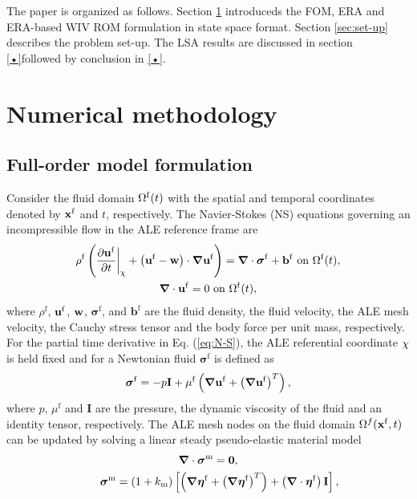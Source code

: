 The paper is organized as follows. Section  \ref{sec:Numeric method} introduceds the FOM, ERA and ERA-based WIV ROM 
formulation in state space format. Section \ref{sec:set-up} describes the problem set-up. The LSA results are discussed 
in section \ref{•}followed by conclusion in \ref{•}. 

\section{Numerical methodology}\label{sec:Numeric method}
\subsection{Full-order model formulation}

Consider the fluid domain $\Omega^\mathrm{f}(t)$ with the spatial and temporal coordinates 
denoted by $\mbox{$\mathbf{x}^{\mathrm{f}}$}$ and $t$, respectively.
%
The Navier-Stokes (NS) equations governing an incompressible flow  
in the ALE reference frame are
\begin{gather}
\rho^\mathrm{f} \left( \frac{\partial \mathbf{u}^\mathrm{f}}{\partial t} \bigg\rvert_{\mathbf{\chi}} + \left(\mathbf{u}^\mathrm{f}-\mathbf{w}\right)\cdot \boldsymbol{\nabla} \mathbf{u}^
\mathrm{f} \right ) = \boldsymbol{\nabla} \cdot \boldsymbol{\sigma}^\mathrm{f} + \mathbf{b}^\mathrm{f} \mbox{ on } \Omega^\mathrm{f}(t) \label{eq:N-S}, \\
\boldsymbol{\nabla} \cdot\mathbf{u}^\mathrm{f} = 0 \mbox{ on } \Omega^\mathrm{f}(t) \label{eq:continuity},
\end{gather}
where $\rho^\mathrm{f}$, $\mathbf{u}^\mathrm{f}$, 
$\mathbf{w}$, $\boldsymbol{\sigma}^\mathrm{f}$, and $\mathbf{b}^\mathrm{f}$ 
are the fluid density, the fluid velocity, the ALE mesh velocity, the 
Cauchy stress tensor and the body force per unit mass, respectively. 
%
For the partial time derivative in Eq. (\ref{eq:N-S}), 
the ALE referential coordinate $\mathbf{\chi}$ is held fixed and for a Newtonian fluid
$\boldsymbol{\sigma}^\mathrm{f}$ is defined as
\begin{equation}
\boldsymbol{\sigma}^\mathrm{f} = -p\mathbf{I} + \mu^\mathrm{f}\left(\boldsymbol{\nabla} \mathbf{u}^\mathrm{f} + \left(\boldsymbol{\nabla} \mathbf{u}^\mathrm{f}\right)^T
\right),
\label{eq:cauchyStress}
\end{equation}
%
where $p$, $\mu^\mathrm{f}$ and $ \mathbf{I} $ are the  pressure, the dynamic viscosity of the fluid and an identity tensor, respectively.
The ALE mesh nodes on the fluid domain $\Omega^f(\mbox{$\mathbf{x}^{\mathrm{f}}$},t)$ can be updated by solving a linear steady pseudo-elastic material model
\begin{gather}
\mbox{\boldmath $\nabla$} \cdot {\mbox{\boldmath $\sigma$}}^\mathrm{m} = \mbox{\boldmath $0$}, \\
\qquad {\mbox{\boldmath $\sigma$}}^\mathrm{m} = (1+k_\mathrm{m})\left[\left(\mbox{\boldmath $\nabla$} \mbox{\boldmath $\eta$}^\mathrm{f}+\left(\mbox{\boldmath $\nabla$}
\mbox{\boldmath $\eta$}^\mathrm{f}\right)^T\right)+\left(\mbox{\boldmath $\nabla$} \cdot \mbox{\boldmath $\eta$}^\mathrm{f}\right)\mbox{\boldmath $\mathrm{I}$} \right], 
\label{MeshEq}
\end{gather} 
